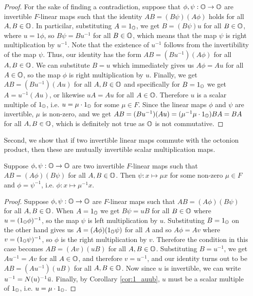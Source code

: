 \begin{proof}
    For the sake of finding a contradiction, suppose that $\phi,\psi : \mathbb{O} \rightarrow \mathbb{O}$ are
    invertible $F$-linear maps such that the identity $AB = (B\psi)(A\phi)$ holds for all \mbox{$A,B\in \mathbb{O}$}.
    In particilar, substituting $A = 1_{\mathbb{O}}$, we get $B = (B\psi) u$ for all $B \in \mathbb{O}$, where $u = 1 \phi$,
    so $B \psi = B u^{-1}$ for all $B \in \mathbb{O}$, which means that the map $\psi$ is right
    multiplication by $u^{-1}$. Note that the existence of $u^{-1}$ follows from the
    invertibility of the map $\psi$. Thus, our identity has the form $AB = (B u^{-1}) (A\phi)$
    for all $A,B \in \mathbb{O}$. We can substitute $B = u$ which immediately gives us $A\phi = Au$ for
    all $A \in \mathbb{O}$, so the map $\phi$ is right multiplication by $u$. Finally, we get
    $AB = (B u^{-1}) (A u)$ for all $A,B \in \mathbb{O}$ and specifically for $B = 1_{\mathbb{O}}$ we get
    $A = u^{-1} (A u)$, or likewise $u A = A u$ for all $A \in \mathbb{O}$. Therefore $u$ is a
    scalar multiple of $1_{\mathbb{O}}$, i.e. $u = \mu \cdot 1_{\mathbb{O}}$ for some $\mu \in F$.
    Since the linear maps $\phi$ and $\psi$ are invertible, $\mu$ is non-zero, and we get
    $AB = (Bu^{-1})(Au) = (\mu^{-1} \mu \cdot 1_{\mathbb{O}}) BA = BA$ for all $A,B \in \mathbb{O}$, which is definitely
    not true as $\mathbb{O}$ is not commutative.
\end{proof}

Second, we show that if two invertible linear maps commute with the octonion product, then
these are mutually invertible scalar multiplication maps.

\begin{lemma}
    \label{lemma:1_white_phipsi2}
    Suppose $\phi,\psi: \mathbb{O} \rightarrow \mathbb{O}$ are two invertible $F$-linear maps such that
    \mbox{$AB = (A\phi) (B\psi)$} for all $A,B \in \mathbb{O}$. Then $\psi : x \mapsto \mu x$
    for some non-zero $\mu \in F$ and $\phi = \psi^{-1}$, i.e. $\phi : x \mapsto \mu^{-1} x$.
\end{lemma}

\begin{proof}
    Suppose $\phi, \psi: \mathbb{O} \rightarrow \mathbb{O}$ are $F$-linear maps such that
    $AB = (A\phi) (B\psi)$ for all $A,B \in \mathbb{O}$. When $A=1_{\mathbb{O}}$ we get $B\psi = uB$ for all
    $B \in \mathbb{O}$ where $u = (1_{\mathbb{O}}\phi)^{-1}$, so
    the map $\psi$ is left multiplication by $u$.
    Substituting $B = 1_{\mathbb{O}}$ on the other hand gives
    us $A = (A\phi) (1_{\mathbb{O}}\psi)$ for all $A$ and so $A\phi = A v$ where $v =
    (1_{\mathbb{O}}\psi)^{-1}$, so $\phi$ is the right multiplication by $v$.
    Therefore the condition in this case becomes $AB = (Av)(uB)$
    for all $A,B \in \mathbb{O}$. Substituting $B = u^{-1}$, we get $Au^{-1} = Av$ for all
    $A \in \mathbb{O}$, and therefore $v = u^{-1}$, and our identity turns out to be
    $AB = (Au^{-1})(uB)$ for
    all $A,B\in \mathbb{O}$. Now since $u$ is invertible, we can write $u^{-1} = N(u)^{-1} \mathord{\mbox{\hspace*{0pt}}\,\overline{\!u\!\!\;}\!\:}\mbox{\hspace*{0pt}}$.
    Finally, by Corollary \ref{cor:1_auub}, $u$ must be a scalar multiple of $1_{\mathbb{O}}$,
    i.e. $u = \mu \cdot 1_{\mathbb{O}}$.
\end{proof}

